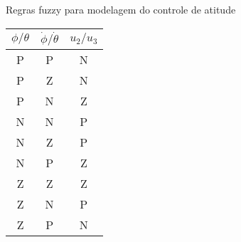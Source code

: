 \begin{quadro}[!htb]
    \centering
    \caption{Regras fuzzy para modelagem do controle de atitude\label{qua:regras_fuzzy_u2_u3_mamdani}}
    \begin{tabular}{|c|c|c|}
        \hline
        \textbf{{$\phi/\theta$}} & 
        \textbf{{$\dot{\phi}/\dot{\theta}$}} &
        \textbf{{$u_2/u_3$}} \\
        \hline %
            P &
            P &
            N \\
        \hline %
            P &
            Z &
            N \\
        \hline %
            P &
            N &
            Z \\
        \hline %
            N &
            N &
            P \\
        \hline %
            N &
            Z &
            P \\
        \hline %
            N &
            P &
            Z \\
        \hline %
            Z &
            Z &
            Z \\
        \hline %
            Z &
            N &
            P \\
        \hline %
            Z &
            P &
            N \\
        \hline
    \end{tabular}
\end{quadro}
